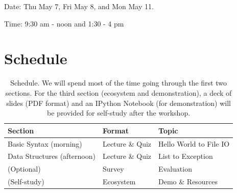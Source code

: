 \documentclass{tufte-handout}
\begin{document}
\noindent Date: Thu May 7, Fri May 8, and Mon May 11.

\noindent Time: 9:30 am - noon and 1:30 - 4 pm

\section{Schedule}\label{sec:schedule}
\begin{table}[ht]
  \selectfont
  \begin{tabular}{lll}
    \toprule
    Section & Format & Topic \\
    \midrule
    Basic Syntax (morning) & Lecture \& Quiz & Hello World to File IO \\
    Data Structures (afternoon) & Lecture \& Quiz & List to Exception \\
    (Optional) & Survey & Evaluation \\
    (Self-study) & Ecosystem & Demo \& Resources \\
    \bottomrule
  \end{tabular}
  \caption{Schedule. 
    We will spend most of the time going through the first two
    sections. For the third section (ecosystem and demonstration),
    a deck of slides (PDF format) and an IPython Notebook (for
    demonstration) will be provided for self-study after the workshop.}
  \label{tab:Schedule}
\end{table}
\end{document}
